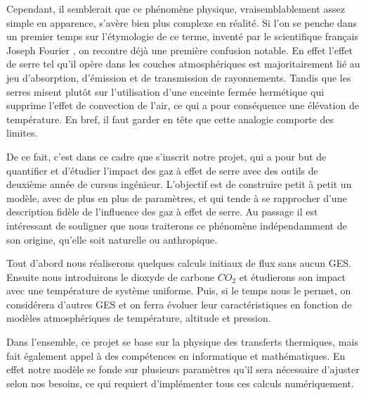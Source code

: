 \documentclass[a4paper, 12pt]{report} %
\begin{document}
\indent Cependant, il semblerait que ce phénomène physique, vraisemblablement assez simple 
en apparence, s'avère bien plus complexe en réalité. Si l'on se penche dans un premier temps sur 
l'étymologie de ce terme, inventé par le scientifique français Joseph Fourier
,
on recontre déjà une première confusion notable. En effet l'effet de serre 
tel qu'il opère dans les couches atmosphériques est majoritairement lié au jeu d'absorption, d'émission 
et de transmission de rayonnements. Tandis que les serres misent plutôt sur l'utilisation d'une enceinte 
fermée hermétique qui supprime l'effet de convection de l'air, ce qui a pour conséquence une élévation 
de température. En bref, il faut garder en tête que cette analogie comporte des limites. \vspace{\baselineskip}

\indent De ce fait, c'est dans ce cadre que s'inscrit notre projet, qui a pour but de quantifier et d'étudier
l'impact des gaz à effet de serre avec des outils de deuxième année de cursus ingénieur. L'objectif est 
de construire petit à petit un modèle, avec de plus en plus de paramètres, et qui tende à se rapprocher
d'une description fidèle de l'influence des gaz à effet de serre. Au passage il est intéressant de souligner
que nous traiterons ce phénomène indépendamment de son origine, qu'elle soit naturelle ou anthropique. \vspace{\baselineskip}

\indent Tout d'abord nous réaliserons quelques calculs initiaux de flux sans aucun GES.
Ensuite nous introduirons le dioxyde de carbone $CO_2$ et étudierons son impact avec une température de
système uniforme. Puis, si le temps nous le permet, on considérera d'autres GES et on ferra évoluer leur caractéristiques
en fonction de modèles atmosphériques de température, altitude et pression. \vspace{\baselineskip}

\indent Dans l'ensemble, ce projet se base sur la physique des transferts thermiques, 
mais fait également appel à des compétences en informatique et mathématiques.
En effet notre modèle se fonde sur plusieurs paramètres qu'il sera nécessaire
d'ajuster selon nos besoins, ce qui requiert d'implémenter tous ces calculs
numériquement. \vspace{\baselineskip}
\end{document}
